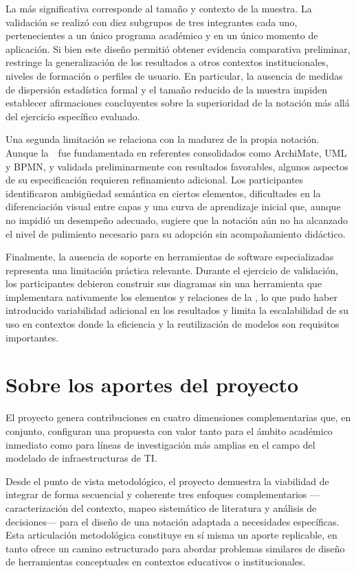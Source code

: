 La más significativa corresponde al tamaño y contexto de la muestra. La validación se realizó con diez subgrupos de tres integrantes cada uno, pertenecientes a un único programa académico y en un único momento de aplicación. Si bien este diseño permitió obtener evidencia comparativa preliminar, restringe la generalización de los resultados a otros contextos institucionales, niveles de formación o perfiles de usuario. En particular, la ausencia de medidas de dispersión estadística formal y el tamaño reducido de la muestra impiden establecer afirmaciones concluyentes sobre la superioridad de la notación más allá del ejercicio específico evaluado.

Una segunda limitación se relaciona con la madurez de la propia notación. Aunque la~\NDITI~fue fundamentada en referentes consolidados como ArchiMate, UML y BPMN, y validada preliminarmente con resultados favorables, algunos aspectos de su especificación requieren refinamiento adicional. Los participantes identificaron ambigüedad semántica en ciertos elementos, dificultades en la diferenciación visual entre capas y una curva de aprendizaje inicial que, aunque no impidió un desempeño adecuado, sugiere que la notación aún no ha alcanzado el nivel de pulimiento necesario para su adopción sin acompañamiento didáctico.

Finalmente, la ausencia de soporte en herramientas de software especializadas representa una limitación práctica relevante. Durante el ejercicio de validación, los participantes debieron construir sus diagramas sin una herramienta que implementara nativamente los elementos y relaciones de la \NDITI, lo que pudo haber introducido variabilidad adicional en los resultados y limita la escalabilidad de su uso en contextos donde la eficiencia y la reutilización de modelos son requisitos importantes.

\section{Sobre los aportes del proyecto}
\noindent
El proyecto genera contribuciones en cuatro dimensiones complementarias que, en conjunto, configuran una propuesta con valor tanto para el ámbito académico inmediato como para líneas de investigación más amplias en el campo del modelado de infraestructuras de TI.

Desde el punto de vista metodológico, el proyecto demuestra la viabilidad de integrar de forma secuencial y coherente tres enfoques complementarios ---caracterización del contexto, mapeo sistemático de literatura y análisis de decisiones--- para el diseño de una notación adaptada a necesidades específicas. Esta articulación metodológica constituye en sí misma un aporte replicable, en tanto ofrece un camino estructurado para abordar problemas similares de diseño de herramientas conceptuales en contextos educativos o institucionales.

